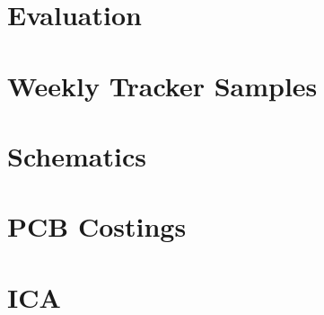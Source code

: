 \documentclass[a4paper, 12pt]{report}
\begin{document}




\chapter{Evaluation}





\nocite{*}



\appendix
\chapter{Weekly Tracker Samples}

\chapter{Schematics}

\chapter{PCB Costings}

\chapter{ICA}

\end{document}

